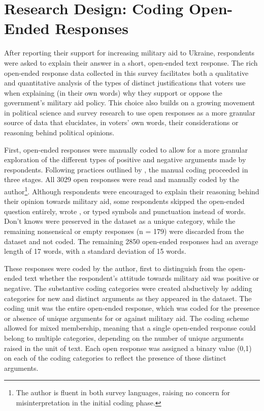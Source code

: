 \section{Research Design: Coding Open-Ended Responses}
After reporting their support for increasing military aid to Ukraine, respondents were asked to explain their answer in a short, open-ended text response. The rich open-ended response data collected in this survey facilitates both a qualitative and quantitative analysis of the types of distinct justifications that voters use when explaining (in their own words) why they support or oppose the government's military aid policy. This choice also builds on a growing movement in political science and survey research to use open responses as a more granular source of data that elucidates, in voters’ own words, their considerations or reasoning behind political opinions.

First, open-ended responses were manually coded to allow for a more granular exploration of the different types of positive and negative arguments made by respondents. Following practices outlined by \citeauthor{krippendorff_content_2019}, the manual coding proceeded in three stages. All 3029 open responses were read and manually coded by the author\footnote{The author is fluent in both survey languages, raising no concern for misinterpretation in the initial coding phase.}. Although respondents were encouraged to explain their reasoning behind their opinion towards military aid, some respondents skipped the open-ended question entirely, wrote , or typed symbols and punctuation instead of words. Don't knows were preserved in the dataset as a unique category, while the remaining nonsensical or empty responses (n = 179) were discarded from the dataset and not coded. The remaining 2850 open-ended responses had an average length of 17 words, with a standard deviation of 15 words. 

These responses were coded by the author, first to distinguish from the open-ended text whether the respondent's attitude towards military aid was positive or negative. The substantive coding categories were created abductively by adding categories for new and distinct arguments as they appeared in the dataset.\autocite{krippendorff_content_2019} The coding unit was the entire open-ended response, which was coded for the presence or absence of unique arguments for or against military aid. The coding scheme allowed for mixed membership, meaning that a single open-ended response could  belong to multiple categories, depending on the number of unique arguments raised in the unit of text. Each open response was assigned a binary value (0,1) on each of the coding categories to reflect the presence of these distinct arguments.

